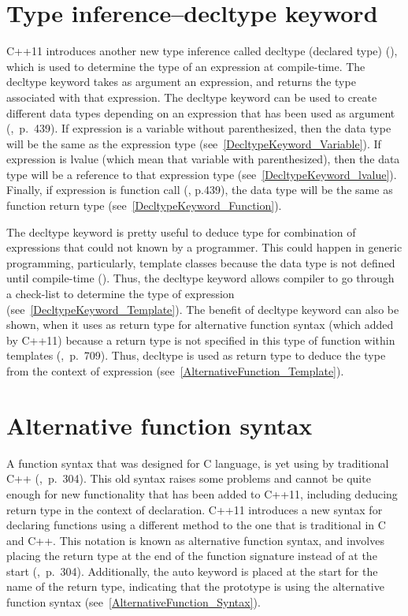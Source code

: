 \documentclass[11pt]{report}
\begin{document}
\section{Type inference–decltype keyword}
\label{section: Decltype keyword}
C++11 introduces another new type inference called decltype (declared type) (\cite{Stroustrup:2012:Cpp11}), which is used to determine the type of an expression at compile-time. The decltype keyword takes as argument an expression, and returns the type associated with that expression. The decltype keyword can be used to create different data types depending on an expression that has been used as argument (\cite{Prata:2012:Cpp},~p.~439). If expression is a variable without parenthesized, then the data type will be the same as the expression type (see~\ref{DecltypeKeyword_Variable}). If expression is lvalue (which mean that variable with parenthesized), then the data type will be a reference to that expression type (see~\ref{DecltypeKeyword_lvalue}). Finally, if expression is function call (\cite{Prata:2012:Cpp}, p.439), the data type will be the same as function return type (see~\ref{DecltypeKeyword_Function}).

The decltype keyword is pretty useful to deduce type for combination of expressions that could not known by a programmer. This could happen in generic programming, particularly, template classes because the data type is not defined until compile-time (\cite{Stroustrup:2012:Cpp11}). Thus, the decltype keyword allows compiler to go through a check-list to determine the type of expression (see~\ref{DecltypeKeyword_Template}). The benefit of decltype keyword can also be shown, when it uses as return type for alternative function syntax (which added by C++11) because a return type is not specified in this type of function within templates (\cite{Gregorie:professionalcpp},~p.~709). Thus, decltype is used as return type to deduce the type from the context of expression (see~\ref{AlternativeFunction_Template}). 

\section{Alternative function syntax}
\label{section: Alternative function syntax}
A function syntax that was designed for C language, is yet using by traditional C++ (\cite{Gregorie:professionalcpp},~p.~304). This old syntax raises some problems and cannot be quite enough for new functionality that has been added to C++11, including deducing return type in the context of declaration. C++11 introduces a new syntax for declaring functions using a different method to the one that is traditional in C and C++. This notation is known as alternative function syntax, and involves placing the return type at the end of the function signature instead of at the start (\cite{Gregorie:professionalcpp},~p.~304). Additionally, the auto keyword is placed at the start for the name of the return type, indicating that the prototype is using the alternative function syntax (see~\ref{AlternativeFunction_Syntax}).
\end{document}
